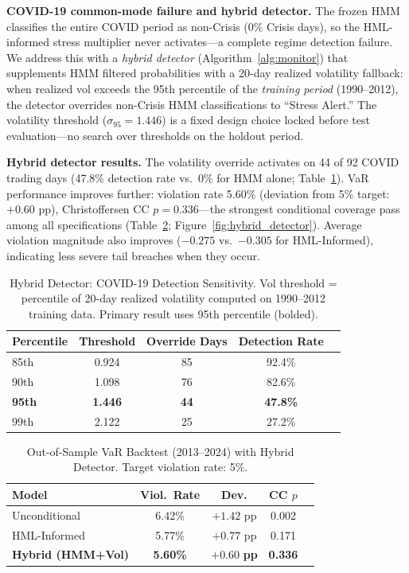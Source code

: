 \documentclass{uai2026}
\begin{document}
\textbf{COVID-19 common-mode failure and hybrid detector.}
The frozen HMM classifies the entire COVID period as non-Crisis (0\% Crisis days),
so the HML-informed stress multiplier never activates---a complete regime detection
failure. We address this with a \emph{hybrid detector} (Algorithm~\ref{alg:monitor})
that supplements HMM filtered probabilities with a 20-day realized volatility
fallback: when realized vol exceeds the 95th percentile of the \emph{training period}
(1990--2012), the detector overrides non-Crisis HMM classifications to ``Stress Alert.''
The volatility threshold ($\sigma_{95} = 1.446$) is a fixed design choice locked
before test evaluation---no search over thresholds on the holdout period.

\textbf{Hybrid detector results.} The volatility override activates on 44 of 92
COVID trading days (47.8\% detection rate vs.\ 0\% for HMM alone;
Table~\ref{tab:hybrid_sensitivity}). VaR performance improves further:
violation rate 5.60\% (deviation from 5\% target: $+0.60$ pp), Christoffersen
CC $p = 0.336$---the strongest conditional coverage pass among all specifications
(Table~\ref{tab:var_hybrid}; Figure~\ref{fig:hybrid_detector}). Average violation magnitude also improves
($-0.275$ vs.\ $-0.305$ for HML-Informed), indicating less severe tail breaches
when they occur.

\begin{table}[t]
\centering
\caption{Hybrid Detector: COVID-19 Detection Sensitivity. Vol threshold =
percentile of 20-day realized volatility computed on 1990--2012 training data.
Primary result uses 95th percentile (bolded).}
\label{tab:hybrid_sensitivity}
\small
\begin{tabular}{lcccc}
\toprule
Percentile & Threshold & Override Days & Detection Rate \\
\midrule
85th & 0.924 & 85 & 92.4\% \\
90th & 1.098 & 76 & 82.6\% \\
\textbf{95th} & \textbf{1.446} & \textbf{44} & \textbf{47.8\%} \\
99th & 2.122 & 25 & 27.2\% \\
\bottomrule
\end{tabular}
\end{table}

\begin{table}[t]
\centering
\caption{Out-of-Sample VaR Backtest (2013--2024) with Hybrid Detector.
Target violation rate: 5\%.}
\label{tab:var_hybrid}
\scriptsize
\begin{tabular}{@{}lcccc@{}}
\toprule
Model & Viol.\ Rate & Dev. & CC $p$ \\
\midrule
Unconditional & 6.42\% & $+1.42$ pp & 0.002 \\
HML-Informed & 5.77\% & $+0.77$ pp & 0.171 \\
\textbf{Hybrid (HMM+Vol)} & \textbf{5.60\%} & $\mathbf{+0.60}$ \textbf{pp} & \textbf{0.336} \\
\bottomrule
\end{tabular}
\end{table}
\end{document}
